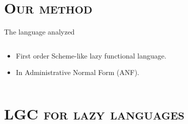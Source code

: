 \documentclass[xcolor=x11names,compress,mathserif]{beamer}
\renewcommand{\(}{\begin{columns}}
\renewcommand{\)}{\end{columns}}
\newcommand{\<}[1]{\begin{column}{#1}}
\renewcommand{\>}{\end{column}}
\begin{document}
\section{\scshape Our method}
\begin{frame}{The language analyzed}
\begin{columns}
  \begin{column}[T]{0.45\textwidth}
\small
    \begin{itemize} \itemsep0.75em
    \item First order Scheme-like lazy functional language.
    \item In Administrative Normal Form (ANF).
    \end{itemize}
\normalsize
  \end{column}
  \begin{column}[T]{0.55\textwidth}
    
  \end{column}
\end{columns}
\end{frame}
\section{\scshape LGC for lazy languages}

\end{document}
